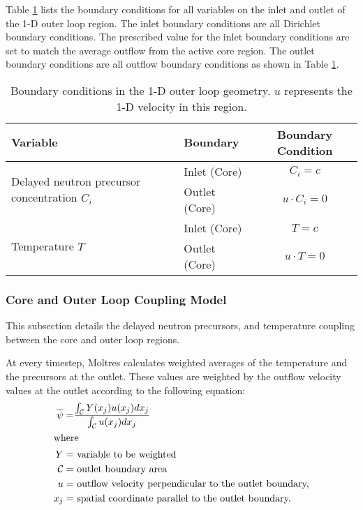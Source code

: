 Table \ref{table:loopbc} lists the boundary conditions for all variables on the inlet and outlet of
the 1-D outer loop region. The inlet boundary conditions are all Dirichlet boundary conditions. The
prescribed value for the inlet boundary conditions are set to match the average outflow from the
active core region. The outlet boundary conditions are all outflow boundary conditions as shown in
Table \ref{table:loopbc}.

\begin{table}[htbp!]
    \small
	\caption{Boundary conditions in the 1-D outer loop geometry. $u$
	represents the 1-D velocity in this region.}
	\centering
	\begin{tabular}{ l l c}
		\toprule
		Variable & Boundary & Boundary Condition \\
        \midrule
        \multirow{2}{*}{Delayed neutron precursor concentration $C_i$} &
        Inlet (Core) & $C_i = c$ \\
        & Outlet (Core) & $u \cdot C_i = 0$ \\
        \midrule
        \multirow{2}{*}{Temperature $T$} &
        Inlet (Core) & $T = c$ \\
        & Outlet (Core) & $u \cdot T = 0$ \\
		\bottomrule
	\end{tabular}
	\label{table:loopbc}
\end{table}

\subsubsection{Core and Outer Loop Coupling Model}

This subsection details the delayed neutron precursors, and
temperature coupling between the core and outer loop regions. 

At every timestep, Moltres calculates weighted averages of the
temperature and the precursors at the outlet. These values are weighted by the
outflow velocity values at the outlet according to the following equation:
%
\begin{align}
    \overline{\psi} =& \frac{\int_\mathcal{C} Y(x_j) u(x_j) dx_j}{
    \int_\mathcal{C} u(x_j) dx_j} \\
    \shortintertext{where}
    Y =& \text{ variable to be weighted} \nonumber \\
    \mathcal{C} =& \text{ outlet boundary area} \nonumber \\
    u =& \text{ outflow velocity perpendicular to the outlet boundary,} \nonumber \\
    x_j =& \text{ spatial coordinate parallel to the outlet boundary.}
    \nonumber
\end{align}

